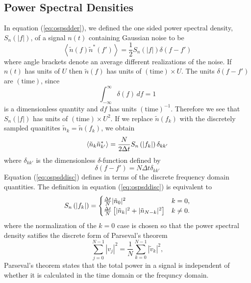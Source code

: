 \subsection{Power Spectral Densities}
\label{ss:psdconv}

In equation (\ref{eq:ospsdder}), we defined the one sided power spectral
density, $S_n(|f|)$, of a signal $n(t)$ containing Gaussian noise to be 
\begin{equation}
\left\langle\tilde{n}(f) \tilde{n}^\ast(f')\right\rangle = 
\frac{1}{2}S_n(|f|)\delta(f-f')
\end{equation}
where angle brackets denote an average different realizations of the noise.
If $n(t)$ has units of $U$ then $\tilde{n}(f)$ has units of
$(\mathrm{time}) \times U$. The units $\delta(f-f')$ are $(\mathrm{time})$,
since 
\begin{equation}
\int_{-\infty}^\infty \delta(f)\,df = 1
\end{equation}
is a dimensionless quantity and $df$ has units $(\mathrm{time})^{-1}$.
Therefore we see that $S_n(|f|)$ has units of $(\mathrm{time})\times U^2$.
If we replace $\tilde{n}(f_k)$ with the discretely sampled quanitites 
$\tilde{n}_k = \tilde{n}(f_k)$, we obtain
\begin{equation}
\left\langle\tilde{n}_k \tilde{n}_{k'}^\ast\right\rangle = 
\frac{N}{2\Delta t}S_n\left(\left|f_{k}\right|\right)\delta_{kk'}
\label{eq:ospsddisc}
\end{equation}
where $\delta_{kk'}$ is the dimensionless $\delta$-function defined by
\begin{equation}
\delta(f-f') = N\Delta t\delta_{kk'}
\end{equation}
Equation (\ref{eq:ospsddisc}) defines \ospsd in terms of the discrete
frequency domain quantities.  The definition in equation (\ref{eq:ospsddisc}) is
equivalent to
\begin{equation}
S_n\left(\left|f_{k}\right|\right) =
\begin{cases}
\frac{\Delta t}{N} | \tilde{n}_0 |^2 & k = 0, \\
\frac{\Delta t}{N} \left[ | \tilde{n}_k |^2 + | \tilde{n}_{N-k} |^2 \right] &
k\neq 0.
\end{cases}
\end{equation}
where the normalization of the $k=0$ case is chosen so that the power spectral
density satifies the discrete form of Parseval's theorem
\begin{equation}
\sum_{j=0}^{N-1} |v_j|^2 = \frac{1}{N} \sum_{k=0}^{N-1} |\tilde{v}_k|^2,
\end{equation}
Parseval's theorem states that the total power in a signal is independent of
whether it is calculated in the time domain or the frequncy domain.

